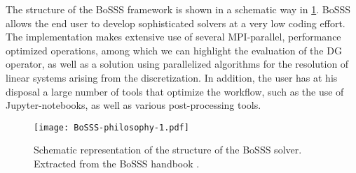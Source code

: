 The structure of the BoSSS framework is shown in a schematic way in \cref{Fig:BoSSS}. BoSSS allows the end user to develop sophisticated solvers at a very low coding effort. The implementation makes extensive use of several MPI-parallel, performance optimized operations, among which we can highlight the evaluation of the DG operator, as well as a solution using parallelized algorithms for the resolution of linear systems arising from the discretization. In addition, the user has at his disposal a large number of tools that optimize the workflow, such as the use of Jupyter-notebooks, as well as various post-processing tools.

\begin{figure}
	\texttt{[image: BoSSS-philosophy-1.pdf]}
	\caption{Schematic representation of the structure of the BoSSS solver. Extracted from the BoSSS handbook \parencite{kummer2020}.}
	\label{Fig:BoSSS}
\end{figure}
